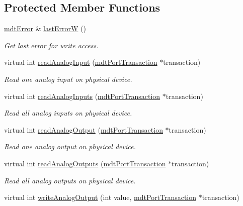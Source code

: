 \subsection*{Protected Member Functions}
\begin{DoxyCompactItemize}
\item 
\hyperlink{classmdt_error}{mdt\-Error} \& \hyperlink{classmdt_device_a6e7133e8665d9113d9423f4db44b1000}{last\-Error\-W} ()
\begin{DoxyCompactList}\small\item\em Get last error for write access. \end{DoxyCompactList}\item 
virtual int \hyperlink{classmdt_device_acecf7934ce29b3a957accb0f4c98c746}{read\-Analog\-Input} (\hyperlink{classmdt_port_transaction}{mdt\-Port\-Transaction} $\ast$transaction)
\begin{DoxyCompactList}\small\item\em Read one analog input on physical device. \end{DoxyCompactList}\item 
virtual int \hyperlink{classmdt_device_a40674e7bf0c367bb3edb407d73a5bd8e}{read\-Analog\-Inputs} (\hyperlink{classmdt_port_transaction}{mdt\-Port\-Transaction} $\ast$transaction)
\begin{DoxyCompactList}\small\item\em Read all analog inputs on physical device. \end{DoxyCompactList}\item 
virtual int \hyperlink{classmdt_device_a7934063c3f41a742515f1232c9598c2a}{read\-Analog\-Output} (\hyperlink{classmdt_port_transaction}{mdt\-Port\-Transaction} $\ast$transaction)
\begin{DoxyCompactList}\small\item\em Read one analog output on physical device. \end{DoxyCompactList}\item 
virtual int \hyperlink{classmdt_device_ab0232ac83c38bc93d3bc2aa91d94c291}{read\-Analog\-Outputs} (\hyperlink{classmdt_port_transaction}{mdt\-Port\-Transaction} $\ast$transaction)
\begin{DoxyCompactList}\small\item\em Read all analog outputs on physical device. \end{DoxyCompactList}\item 
virtual int \hyperlink{classmdt_device_ae764634bba2b321ac2b4731c0353e45f}{write\-Analog\-Output} (int value, \hyperlink{classmdt_port_transaction}{mdt\-Port\-Transaction} $\ast$transaction)

\end{DoxyCompactItemize}
